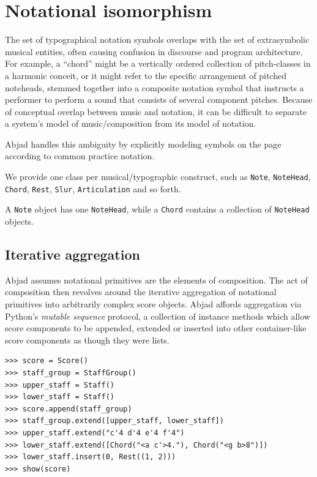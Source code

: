 \section{Notational isomorphism}\label{sec:notational_isomorphism}

The set of typographical notation symbols overlaps with the set of
extrasymbolic musical entities, often causing confusion in discourse and
program architecture. For example, a “chord” might be a vertically ordered
collection of pitch-classes in a harmonic conceit, or it might refer to the
specific arrangement of pitched noteheads, stemmed together into a composite
notation symbol that instructs a performer to perform a sound that consists of
several component pitches. Because of conceptual overlap between music and
notation, it can be difficult to separate a system’s model of music/composition
from its model of notation.

Abjad handles this ambiguity by explicitly modeling symbols on the page
according to common practice notation.

We provide one class per musical/typographic construct, such as \texttt{Note},
\texttt{NoteHead}, \texttt{Chord}, \texttt{Rest}, \texttt{Slur},
\texttt{Articulation} and so forth.

A \texttt{Note} object has one \texttt{NoteHead}, while a \texttt{Chord}
contains a collection of \texttt{NoteHead} objects.

\subsection{Iterative aggregation}

Abjad assumes notational primitives are the elements of composition. The act of
composition then revolves around the iterative aggregation of notational
primitives into arbitrarily complex score objects. Abjad affords aggregation
via Python's \emph{mutable sequence} protocol, a collection of instance methods
which allow score components to be appended, extended or inserted into other
container-like score components as though they were lists.

\begin{lstlisting}
>>> score = Score()
>>> staff_group = StaffGroup()
>>> upper_staff = Staff()
>>> lower_staff = Staff()
>>> score.append(staff_group)
>>> staff_group.extend([upper_staff, lower_staff])
>>> upper_staff.extend("c'4 d'4 e'4 f'4")
>>> lower_staff.extend([Chord("<a c'>4."), Chord("<g b>8")])
>>> lower_staff.insert(0, Rest((1, 2)))
>>> show(score)
\end{lstlisting}

